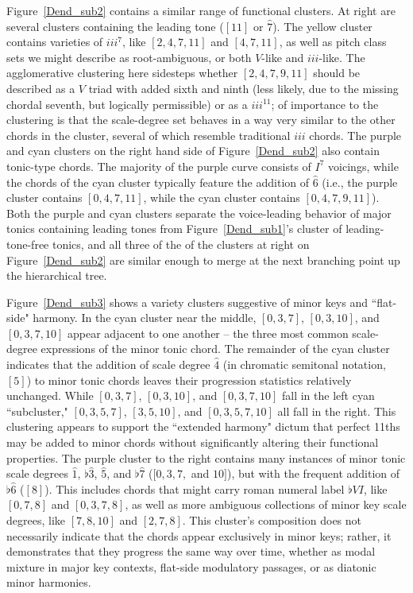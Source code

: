 Figure~\ref{Dend_sub2} contains a similar range of functional clusters.  At right are several clusters containing the leading tone ($[11]$ or $\hat{7}$).  The yellow cluster contains varieties of $iii^7$, like $[2,4,7,11]$ and $[4,7,11]$, as well as pitch class sets we might describe as root-ambiguous, or both $V$-like and $iii$-like.  The agglomerative clustering here sidesteps whether $[2,4,7,9,11]$ should be described as a $V$ triad with added sixth and ninth (less likely, due to the missing chordal seventh, but logically permissible) or as a $iii^{11}$; of importance to the clustering is that the scale-degree set behaves in a way very similar to the other chords in the cluster, several of which resemble traditional $iii$ chords.  The purple and cyan clusters on the right hand side of Figure~\ref{Dend_sub2} also contain tonic-type chords.  The majority of the purple curve consists of $I^7$ voicings, while the chords of the cyan cluster typically feature the addition of $\hat{6}$ (i.e., the purple cluster contains $[0,4,7,11]$, while the cyan cluster contains $[0,4,7,9,11]$).  Both the purple and cyan clusters separate the voice-leading behavior of major tonics containing leading tones from Figure~\ref{Dend_sub1}'s cluster of leading-tone-free tonics, and all three of the of the clusters at right on Figure~\ref{Dend_sub2} are similar enough to merge at the next branching point up the hierarchical tree.

Figure~\ref{Dend_sub3} shows a variety clusters suggestive of minor keys and ``flat-side" harmony.  In the cyan cluster near the middle, $[0,3,7]$, $[0,3,10]$, and $[0,3,7,10]$ appear adjacent to one another -- the three most common scale-degree expressions of the minor tonic chord.  The remainder of the cyan cluster indicates that the addition of scale degree $\hat{4}$ (in chromatic semitonal notation, $[5]$) to minor tonic chords leaves their progression statistics relatively unchanged.  While $[0,3,7]$, $[0,3,10]$, and $[0,3,7,10]$ fall in the left cyan ``subcluster," $[0,3,5,7]$, $[3,5,10]$, and $[0,3,5,7,10]$ all fall in the right.  This clustering appears to support the ``extended harmony" dictum that perfect 11ths may be added to minor chords without significantly altering their functional properties.  The purple cluster to the right contains many instances of minor tonic scale degrees $\hat{1}$, $\flat\hat{3}$, $\hat{5}$, and $\flat\hat{7}$ ($[0,3,7,$ and $10]$), but with the frequent addition of $\flat\hat{6}$ ($[8]$).  This includes chords that might carry roman numeral label $\flat VI$, like $[0,7,8]$ and $[0,3,7,8]$, as well as more ambiguous collections of minor key scale degrees, like $[7,8,10]$ and $[2,7,8]$.  This cluster's composition does not necessarily indicate that the chords appear exclusively in minor keys; rather, it demonstrates that they progress the same way over time, whether as modal mixture in major key contexts, flat-side modulatory passages, or as diatonic minor harmonies.

